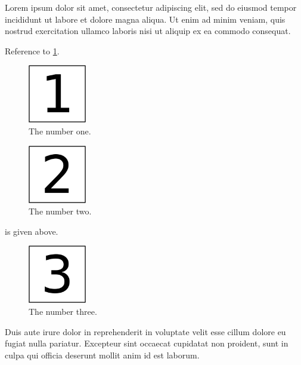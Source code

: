 Lorem ipsum dolor sit amet, consectetur adipiscing elit, sed do eiusmod
tempor incididunt ut labore et dolore magna aliqua. Ut enim ad minim
veniam, quis nostrud exercitation ullamco laboris nisi ut aliquip ex ea
commodo consequat.

Reference to \cref{fig:1}.

\begin{figure}
\hypertarget{fig:1}{%
\centering
\includegraphics[width=1in,height=\textheight]{img/fig-1.png}
\caption{The number one.}\label{fig:1}
}
\end{figure}

\begin{figure}
\hypertarget{fig:2}{%
\centering
\includegraphics[width=1in,height=\textheight]{img/fig-2.png}
\caption{The number two.}\label{fig:2}
}
\end{figure}

 is given above.

\begin{figure}
\hypertarget{fig:}{%
\centering
\includegraphics[width=1in,height=\textheight]{img/fig-3.png}
\caption{The number three.}\label{fig:}
}
\end{figure}

Duis aute irure dolor in reprehenderit in voluptate velit esse cillum
dolore eu fugiat nulla pariatur. Excepteur sint occaecat cupidatat non
proident, sunt in culpa qui officia deserunt mollit anim id est laborum.
